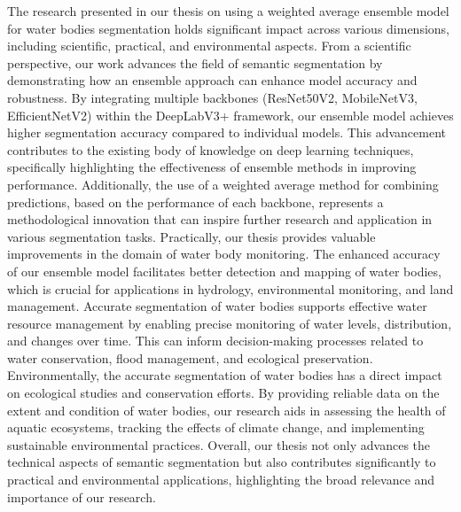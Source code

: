 The research presented in our thesis on using a weighted average ensemble model for water bodies segmentation holds significant impact across various dimensions, including scientific, practical, and environmental aspects.
From a scientific perspective, our work advances the field of semantic segmentation by demonstrating how an ensemble approach can enhance model accuracy and robustness. By integrating multiple backbones (ResNet50V2, MobileNetV3, EfficientNetV2) within the DeepLabV3+ framework, our ensemble model achieves higher segmentation accuracy compared to individual models. This advancement contributes to the existing body of knowledge on deep learning techniques, specifically highlighting the effectiveness of ensemble methods in improving performance. Additionally, the use of a weighted average method for combining predictions, based on the performance of each backbone, represents a methodological innovation that can inspire further research and application in various segmentation tasks.
Practically, our thesis provides valuable improvements in the domain of water body monitoring. The enhanced accuracy of our ensemble model facilitates better detection and mapping of water bodies, which is crucial for applications in hydrology, environmental monitoring, and land management. Accurate segmentation of water bodies supports effective water resource management by enabling precise monitoring of water levels, distribution, and changes over time. This can inform decision-making processes related to water conservation, flood management, and ecological preservation.
Environmentally, the accurate segmentation of water bodies has a direct impact on ecological studies and conservation efforts. By providing reliable data on the extent and condition of water bodies, our research aids in assessing the health of aquatic ecosystems, tracking the effects of climate change, and implementing sustainable environmental practices. Overall, our thesis not only advances the technical aspects of semantic segmentation but also contributes significantly to practical and environmental applications, highlighting the broad relevance and importance of our research.

